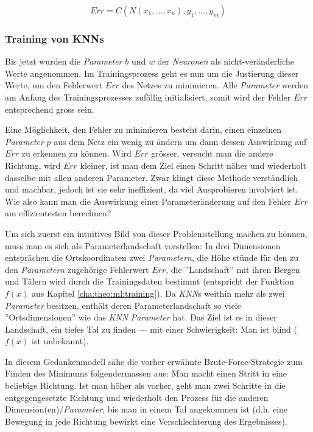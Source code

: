 \begin{equation}\label{eq:err_func}
Err = C(N(x_1,...,x_n), y_1,...,y_m)
\end{equation}

\subsubsection{Training von KNNs}\label{cha:theo:backprop}
Bis jetzt wurden die \textit{Parameter} $b$ und $w$ der \textit{Neuronen} als nicht-veränderliche Werte angenommen. Im Trainingsprozess geht es nun um die Justierung dieser Werte, um den Fehlerwert $Err$ des Netzes zu minimieren. Alle \textit{Parameter} werden am Anfang des Trainingsprozesses zufällig initialisiert, somit wird der Fehler $Err$ entsprechend gross sein.

Eine Möglichkeit, den Fehler zu minimieren besteht darin, einen einzelnen \textit{Parameter} $p$ aus dem Netz ein wenig zu ändern um dann dessen Auswirkung auf $Err$ zu erkennen zu können. Wird $Err$ grösser, versucht man die andere Richtung, wird $Err$ kleiner, ist man dem Ziel einen Schritt näher und wiederholt dasselbe mit allen anderen Parameter. Zwar klingt diese Methode verständlich und machbar, jedoch ist sie sehr ineffizient, da viel Ausprobieren involviert ist. Wie also kann man die Auswirkung einer Parameteränderung auf den Fehler $Err$ am effizientesten berechnen?

Um sich zuerst ein intuitives Bild von dieser Problemstellung machen zu können, muss man es sich als Parameterlandschaft vorstellen: In drei Dimensionen entsprächen die Ortskoordinaten zwei \textit{Parametern}, die Höhe stünde für den zu den \textit{Parametern} zugehörige Fehlerwert $Err$, die ''Landschaft'' mit ihren Bergen und Tälern wird durch die Trainingsdaten bestimmt (entspricht der Funktion $f(x)$ aus Kapitel \ref{cha:theo:ml:training}). Da \textit{KNN}s weithin mehr als zwei \textit{Parameter} besitzen, enthält deren Parameterlandschaft so viele ''Ortsdimensionen'' wie das \textit{KNN} \textit{Parameter} hat. Das Ziel ist es in dieser Landschaft, ein tiefes Tal zu finden --- mit einer Schwierigkeit: Man ist blind ($f(x)$ ist unbekannt).

In diesem Gedankenmodell sähe die vorher erwähnte Brute-Force-Strategie zum Finden des Minimums folgendermassen aus: Man macht einen Stritt in eine beliebige Richtung. Ist man höher als vorher, geht man zwei Schritte in die entgegengesetzte Richtung und wiederholt den Prozess für die anderen Dimension(en)/\textit{Parameter}, bis man in einem Tal angekommen ist (d.h. eine Bewegung in jede Richtung bewirkt eine Verschlechterung des Ergebnisses).

